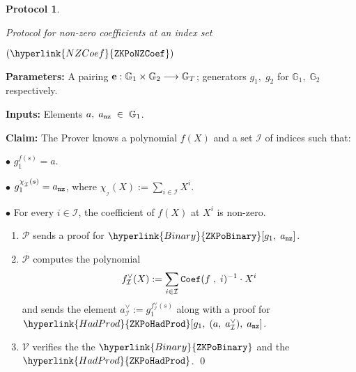\documentclass[11pt, lettersize, notitlepage, leqno, footskip=0.6cm]{article}
\newcommand{\lra}{\longrightarrow}
\newcommand{\mc}{\mathcal}
\newcommand{\mb}{\mathbb}
\newcommand{\mP}{\mc{P}}
\newcommand{\V}{\mc{V}}
\newcommand{\vs}{\vspace{-0.15cm}}
\newcommand{\noin}{\noindent}
\newtheorem{Prot}[Thm]{Protocol}
\numberwithin{equation}{section}
\begin{document}
\begin{mdframed}
\begin{Prot} \hypertarget{NZCoef}{Protocol for non-zero coefficients at an index set} $(\hyperlink{NZCoef}{\tt{ZKPoNZCoef}})$\end{Prot}  

\noindent \textbf{Parameters:} A pairing ${\bf{e}}:\mb{G}_1\times \mb{G}_2\lra \mb{G}_T$; generators $g_1,\;g_2$ for $\mb{G}_1,\; \mb{G}_2$ respectively.


\noindent \textbf{Inputs:} Elements $a,\; a_{\tt{nz}}\;\in \;\mb{G}_1$.

\noindent \textbf{Claim:} The Prover knows a polynomial $f(X)$ and a set $\mc{I}$ of indices such that: \vspace{2mm}

\noin $\bullet$ $g_1^{f(s)} = a$. \vspace{1mm}

\noin $\bullet$ $g_1^{\chi_{_\mc{I}}(s)} =a_{\tt{nz}}$, where $\chi_{_\mc{I}}(X):= \sum\limits_{i\in \mc{I}} X^i. $ \vspace{1mm}

\noin $\bullet$ For every $i\in \mc{I}$, the coefficient of $f(X)$ at $X^i$ is non-zero.

\begin{enumerate}[wide, labelwidth=!, labelindent=0pt, itemsep=-0.2ex] 

\item $\mP$ sends a proof for $\hyperlink{Binary}{\tt{ZKPoBinary}}[g_1,\;a_{\tt{nz}}]$.

\item $\mP$ computes the polynomial \vs $$ f_{\mc{I}}^{\vee}(X):=  \sum\limits_{i\in \mc{I}} {\tt{Coef}}(f\;,\;i)^{-1}\cdot X^i  \vs $$ and sends the element $a_{\mc{I}}^{\vee}:= g_1^{f_{\mc{I}}^{\vee}(s)}$ along with a proof for $\hyperlink{HadProd}{\tt{ZKPoHadProd}}[g_1,\;(a,\;a_{\mc{I}}^{\vee}),\;a_{\tt{nz}}]$.


\item $\V$ verifies the the $\hyperlink{Binary}{\tt{ZKPoBinary}}$ and the $\hyperlink{HadProd}{\tt{ZKPoHadProd}}$. 
\qed

\end{enumerate} \end{mdframed} 












\bigskip
\end{document}
